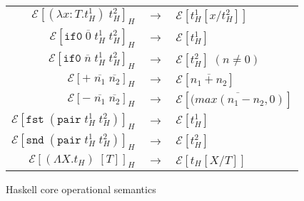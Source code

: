 \begin{figure}
\onehalfspacing
\begin{center}
\begin{tabular}{rcl}
$\mathscr{E}[(\lambda x:T.t_{H}^{1})\;t_{H}^{2}]_{H}$ & $\rightarrow$ & $\mathscr{E}[t_{H}^{1}[x/t_{H}^{2}]]$ \\
$\mathscr{E}[\mathtt{if0}\;\overline{0}\;t_{H}^{1}\;t_{H}^{2}]_{H}$ & $\rightarrow$ & $\mathscr{E}[t_{H}^{1}]$ \\
$\mathscr{E}[\mathtt{if0}\;\overline{n}\;t_{H}^{1}\;t_{H}^{2}]_{H}$ & $\rightarrow$ & $\mathscr{E}[t_{H}^{2}]\;(n\neq0)$ \\
$\mathscr{E}[+\;\overline{n_{1}}\;\overline{n_{2}}]_{H}$ & $\rightarrow$ & $\mathscr{E}[\overline{n_{1}+n_{2}}]$ \\
$\mathscr{E}[-\;\overline{n_{1}}\;\overline{n_{2}}]_{H}$ & $\rightarrow$ & $\mathscr{E}[\overline{(max(n_{1}-n_{2},0)}]$ \\
$\mathscr{E}[\mathtt{fst}\;(\mathtt{pair}\;t_{H}^{1}\;t_{H}^{2})]_{H}$ & $\rightarrow$ & $\mathscr{E}[t_{H}^{1}]$ \\
$\mathscr{E}[\mathtt{snd}\;(\mathtt{pair}\;t_{H}^{1}\;t_{H}^{2})]_{H}$ & $\rightarrow$ & $\mathscr{E}[t_{H}^{2}]$ \\
$\mathscr{E}[(\Lambda X.t_{H})\;[T]]_{H}$ & $\rightarrow$ & $\mathscr{E}[t_{H}[X/T]]$
\end{tabular}
\end{center}
\caption{Haskell core operational semantics}
\label{fig:hcos}
\end{figure}
